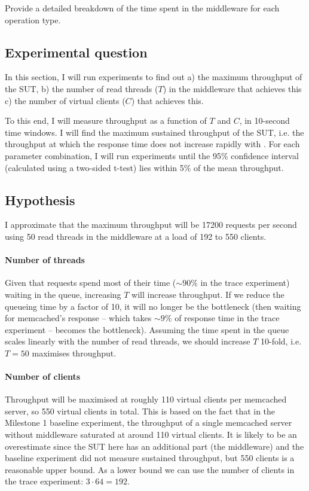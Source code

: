 \documentclass[11pt]{article}
\newcommand{\todo}[1]{\fcolorbox{black}{Apricot}{TODO: #1}}
\begin{document}
Provide a detailed breakdown of the time spent in the middleware for each operation type.

\subsection{Experimental question}

In this section, I will run experiments to find out a) the maximum throughput of the SUT, b) the number of read threads ($T$) in the middleware that achieves this c) the number of virtual clients ($C$) that achieves this.

To this end, I will measure throughput as a function of $T$ and $C$, in 10-second time windows. I will find the maximum sustained throughput of the SUT, i.e. the throughput at which the response time does not increase rapidly with \todo{additional clients}. For each parameter combination, I will run experiments until the 95\% confidence interval (calculated using a two-sided t-test) lies within 5\% of the mean throughput.

\subsection{Hypothesis}

I approximate that the maximum throughput will be 17200 requests per second using 50 read threads in the middleware at a load of 192 to 550 clients.

\paragraph{Number of threads} 
Given that requests spend most of their time ($\sim90\%$ in the trace experiment) waiting in the queue, increasing $T$ will increase throughput. If we reduce the queueing time by a factor of 10, it will no longer be the bottleneck (then waiting for memcached's response -- which takes $\sim9\%$ of response time in the trace experiment -- becomes the bottleneck). Assuming the time spent in the queue scales linearly with the number of read threads, we should increase $T$ 10-fold, i.e. $T=50$ maximises throughput.

\paragraph{Number of clients}
Throughput will be maximised at roughly 110 virtual clients per memcached server, so 550 virtual clients in total. This is based on the fact that in the Milestone 1 baseline experiment, the throughput of a single memcached server without middleware saturated at around 110 virtual clients. It is likely to be an overestimate since the SUT here has an additional part (the middleware) and the baseline experiment did not measure sustained throughput, but 550 clients is a reasonable upper bound. As a lower bound we can use the number of clients in the trace experiment: $3 \cdot 64=192$.
\end{document}
